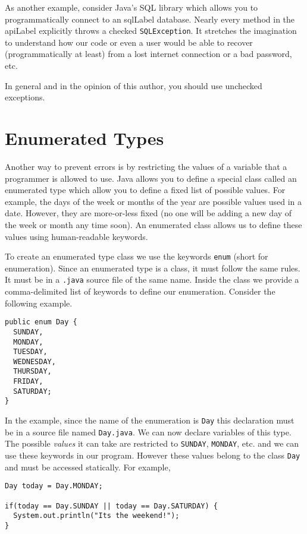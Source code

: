 As another example, consider Java's SQL library which allows you to 
programmatically connect to an \gls{sqlLabel} database.  Nearly every
method in the \gls{apiLabel} explicitly throws a checked \texttt{SQLException}.
It stretches the imagination to understand how our code or even a
user would be able to recover (programmatically at least) from 
a lost internet connection or a bad password, etc.  

In general and in the opinion of this author, you should use
unchecked exceptions.

\section{Enumerated Types}

Another way to prevent errors is by restricting the values of a variable
that a programmer is allowed to use.  Java allows you to define a 
special class called an 
\gls{enumerated type} which allow you to define a fixed
list of possible values.  For example, the days of the
week or months of the year are possible values used in a date.
However, they are more-or-less fixed (no one will be adding a new
day of the week or month any time soon).  An enumerated 
class allows us to define these values using human-readable 
keywords.

To create an enumerated type class we use the keywords 
\texttt{enum} (short for enumeration).  Since an
enumerated type is a class, it must follow the same rules.
It must be in a \texttt{.java} source file of the same
name.  Inside the class we provide a comma-delimited 
list of keywords to define our enumeration.  
Consider the following example.

\begin{verbatim}
public enum Day {
  SUNDAY,
  MONDAY,
  TUESDAY,
  WEDNESDAY,
  THURSDAY,
  FRIDAY,
  SATURDAY;
}
\end{verbatim}

In the example, since the name of the enumeration is 
\texttt{Day} this declaration must be in a source file
named \texttt{Day.java}.  We can now declare 
variables of this type.  The possible \emph{values} it can 
take are restricted to \texttt{SUNDAY}, 
\texttt{MONDAY}, etc. and we can use these keywords 
in our program.  However these values belong to the
class \texttt{Day} and must be accessed statically.
For example,

\begin{verbatim}
Day today = Day.MONDAY;

if(today == Day.SUNDAY || today == Day.SATURDAY) {
  System.out.println("Its the weekend!");
}
\end{verbatim}

